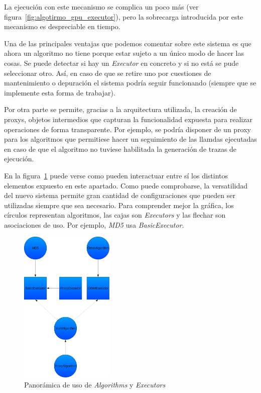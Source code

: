 La ejecución con este mecanismo se complica un poco más (ver figura~\ref{fig:algotirmo_gpu_executor}), pero la sobrecarga introducida por este mecanismo es despreciable en tiempo.

Una de las principales ventajas que podemos comentar sobre este sistema es que ahora un algoritmo no tiene porque estar sujeto a un único modo de hacer las cosas. Se puede detectar si hay un \emph{Executor} en concreto y si no está se pude seleccionar otro. Así, en caso de que se retire uno por cuestiones de mantenimiento o depuración el sistema podría seguir funcionando (siempre que se implemente esta forma de trabajar).

Por otra parte se permite, gracias a la arquitectura utilizada, la creación de proxys, objetos intermedios que capturan la funcionalidad expuesta para realizar operaciones de forma transparente. Por ejemplo, se podría disponer de un proxy para los algoritmos que permitiese hacer un seguimiento de las llamdas ejecutadas en caso de que el algoritmo no tuviese habilitada la generación de trazas de ejecución.

En la figura~\ref{fig:alg_ex_prox} puede verse como pueden interactuar entre sí los distintos elementos expuesto en este apartado. Como puede comprobarse, la versatilidad del nuevo sistema permite gran cantidad de configuraciones que pueden ser utilizadas siempre que sea necesario. Para comprender mejor la gráfica, los círculos representan algoritmos, las cajas son \emph{Executors} y las flechar son asociaciones de uso. Por ejemplo, \emph{MD5} usa \emph{BasicExecutor}.

\begin{figure}
	\centering
	\includegraphics[width=0.4\textwidth]{images/algorithms_executors_proxys.pdf}
	\caption{Panorámica de uso de \emph{Algorithms} y \emph{Executors}}\label{fig:alg_ex_prox}
\end{figure}

